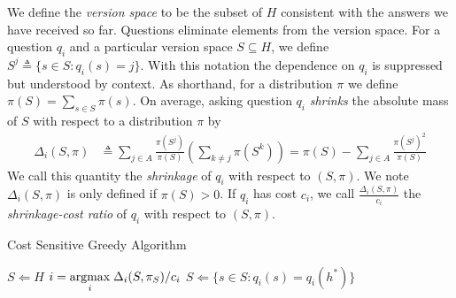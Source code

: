 \documentclass{article}
\newcommand{\argmax}[1]{{\hbox{$\underset{#1}{\operatorname{argmax}}\;$}}}
\begin{document}
We define the \emph{version space} to be the subset of $H$
consistent with the answers we have received so far.  Questions eliminate
elements from the version space.  For a question $q_i$ and a particular
version space $S \subseteq H$, we define $S^j \triangleq \lbrace s
\in S : q_i(s)=j \rbrace$.  With this notation the dependence on $q_i$
is suppressed but understood by context.  As shorthand, for a
distribution $\pi$ we define $\pi(S) = \sum_{s \in S} \pi(s)$.  On
average, asking question $q_i$ \emph{shrinks} the absolute mass of $S$ with
respect to a distribution $\pi$ by
\[ \begin{split}
\Delta_i(S,\pi) & \triangleq \sum_{j \in A} \frac{\pi(S^j)}{\pi(S)}(\sum_{k
  \neq j} \pi(S^k)) 
= \pi(S) - \sum_{j \in A}
\frac{\pi(S^j)^2}{\pi(S)} 
\end{split} \] 
We call this quantity the
\emph{shrinkage} of $q_i$ with respect to $(S,\pi)$.  We note
$\Delta_i(S,\pi)$ is only defined if $\pi(S) > 0$.  If $q_i$ has cost
$c_i$, we call $\frac{\Delta_i(S,\pi)}{c_i}$ the \emph{shrinkage-cost
  ratio} of $q_i$ with respect to $(S,\pi)$.  

\begin{algorithm}[t]
\caption{Cost Sensitive Greedy Algorithm}
\begin{algorithmic}[1]
\STATE $S \Leftarrow H$
\REPEAT
\STATE $i = \argmax{i} \Delta_i(S, \pi_S) / c_i$
\STATE $S \Leftarrow \lbrace s \in S : q_i(s) = q_i(h^*) \rbrace$
\end{algorithmic}
\label{greedyalg}
\end{algorithm}
\end{document}
